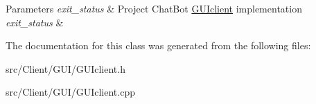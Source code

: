 \begin{DoxyParams}{Parameters}
{\em exit\+\_\+status} & Project Chat\+Bot \mbox{\hyperlink{classGUIclient}{G\+U\+Iclient}} implementation \\
\hline
{\em exit\+\_\+status} & \\
\hline
\end{DoxyParams}


The documentation for this class was generated from the following files\+:\begin{DoxyCompactItemize}
\item 
src/\+Client/\+G\+U\+I/G\+U\+Iclient.\+h\item 
src/\+Client/\+G\+U\+I/G\+U\+Iclient.\+cpp\end{DoxyCompactItemize}
